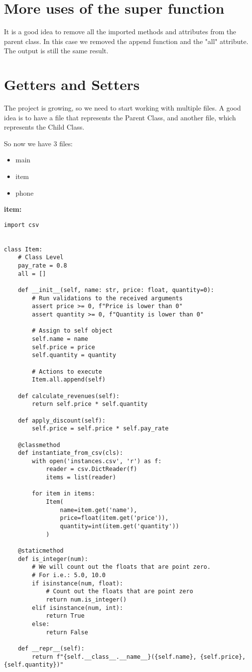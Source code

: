\documentclass{article}
\begin{document}
\section{More uses of the super function}
It is a good idea to remove all the imported methods and attributes from the parent class. In this case we removed the append function and the "all" attribute. The output is still the same result.

\section{Getters and Setters}
The project is growing, so we need to start working with multiple files.
A good idea is to have a file that represents the Parent Class, and another file, which represents the Child Class.

So now we have 3 files:
\begin{itemize}
	\item main
	\item item
	\item phone
\end{itemize}

\textbf{item:}
\begin{lstlisting}
import csv


class Item:
	# Class Level
	pay_rate = 0.8
	all = []
	
	def __init__(self, name: str, price: float, quantity=0):
		# Run validations to the received arguments
		assert price >= 0, f"Price is lower than 0"
		assert quantity >= 0, f"Quantity is lower than 0"
		
		# Assign to self object
		self.name = name
		self.price = price
		self.quantity = quantity
		
		# Actions to execute
		Item.all.append(self)
		
	def calculate_revenues(self):
		return self.price * self.quantity
		
	def apply_discount(self):
		self.price = self.price * self.pay_rate
		
	@classmethod
	def instantiate_from_csv(cls):
		with open('instances.csv', 'r') as f:
			reader = csv.DictReader(f)
			items = list(reader)
		
		for item in items:
			Item(
				name=item.get('name'),
				price=float(item.get('price')),
				quantity=int(item.get('quantity'))
			)
		
	@staticmethod
	def is_integer(num):
		# We will count out the floats that are point zero.
		# For i.e.: 5.0, 10.0
		if isinstance(num, float):
			# Count out the floats that are point zero
			return num.is_integer()
		elif isinstance(num, int):
			return True
		else:
			return False
	
	def __repr__(self):
		return f"{self.__class__.__name__}({self.name}, {self.price}, {self.quantity})"
\end{lstlisting}
\end{document}
